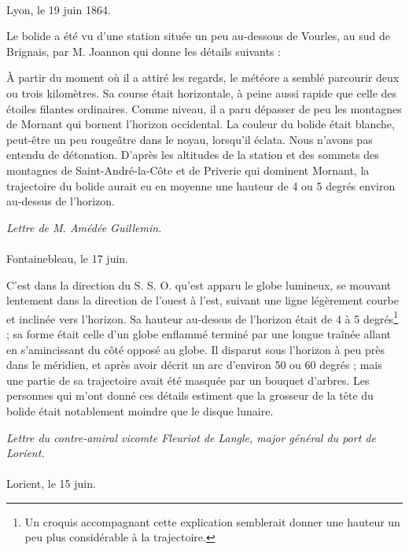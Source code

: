 \documentclass[a4paper, 11pt, oneside, polutonikogreek, french]{article}
\begin{document}
\paragraph{}
Lyon, le 19 juin 1864.

Le bolide a été vu d'une station située un peu au-dessous de Vourles, au sud de Brignais, par M. Joannon qui donne les détails suivants :

À partir du moment où il a attiré les regards, le météore a semblé parcourir deux ou trois kilomètres. Sa course était horizontale, à peine aussi rapide que celle des étoiles filantes ordinaires. Comme niveau, il a paru dépasser de peu les montagnes de Mornant qui bornent l'horizon occidental. La couleur du bolide était blanche, peut-être un peu  rougeâtre dans le noyau, lorsqu'il éclata. Nous n'avons pas entendu de détonation. D'après les altitudes de la station et des sommets des montagnes de Saint-André-la-Côte et de Priverie qui dominent Mornant, la trajectoire du bolide aurait eu en moyenne une hauteur de 4 ou 5 degrés environ au-dessus de l'horizon.
\begin{center}
\emph{Lettre de M. Amédée Guillemin.}
\end{center}
\paragraph{}
Fontainebleau, le 17 juin.

C'est dans la direction du S. S. O. qu'est apparu le globe lumineux, se mouvant lentement dans la direction de l'ouest à l'est, suivant une ligne légèrement courbe et inclinée vers l'horizon. Sa hauteur au-dessus de l'horizon était de 4 à 5 degrés\footnote{Un croquis accompagnant cette explication semblerait donner une hauteur un peu plus considérable à la trajectoire.} ; sa forme était celle d'un globe enflammé terminé par une longue traînée allant en s'amincissant du côté opposé au globe. Il disparut sous l'horizon à peu près dans le méridien, et après avoir décrit un arc d'environ 50 ou 60 degrés ; mais une partie de sa trajectoire avait été masquée par un bouquet d'arbres. Les personnes qui m'ont donné ces détails estiment que la grosseur de la tête du bolide était notablement moindre que le disque lunaire.
\begin{center}
\emph{Lettre du contre-amiral vicomte Fleuriot de Langle, major général du port de Lorient.}
\end{center}
\paragraph{}
Lorient, le 15 juin.
\end{document}
